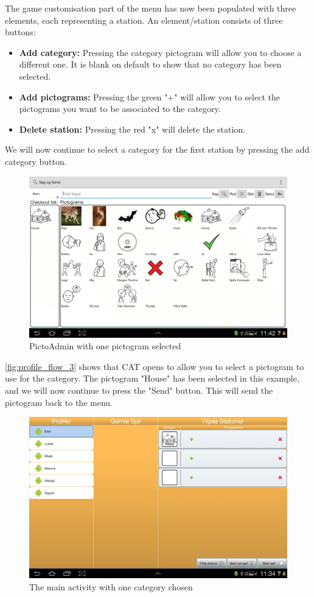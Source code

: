 The game customisation part of the menu has now been populated with three elements, each representing a station. An element/station consists of three buttons:
\begin{itemize}
\item \textbf{Add category:} Pressing the category pictogram will allow you to choose a different one. It is blank on default to show that no category has been selected.
\item \textbf{Add pictograms:} Pressing the green "+" will allow you to select the pictograms you want to be associated to the category.
\item \textbf{Delete station:} Pressing the red "x" will delete the station.
\end{itemize}
We will now continue to select a category for the first station by pressing the add category button.

\begin{figure}[H]
\centering
\includegraphics[width=0.9\linewidth]{img/screenshots/profile_flow_3.jpg}%
\caption{PictoAdmin with one pictogram selected}
\label{fig:profile_flow_3}
\end{figure}

\autoref{fig:profile_flow_3} shows that CAT  opens to allow you to select a pictogram to use for the category.
The pictogram "House" has been selected in this example, and we will now continue to press the "Send" button. This will send the pictogram back to the menu.

\begin{figure}[H]
\centering
\includegraphics[width=0.9\linewidth]{img/screenshots/profile_flow_4.jpg}%
\caption{The main activity with one category chosen}
\label{fig:profile_flow_4}
\end{figure}

